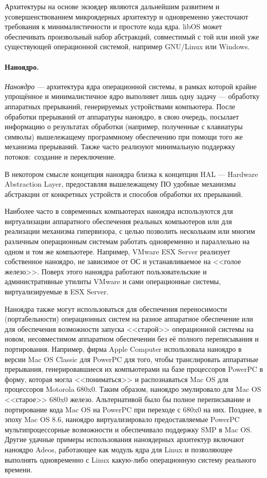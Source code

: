Архитектуры на основе экзоядер являются дальнейшим развитием и усовершенствованием микроядерных архитектур и одновременно ужесточают требования к минималистичности и простоте кода ядра. libOS может обеспечивать произвольный набор абстракций, совместимый с той или иной уже существующей операционной системой, например GNU/Linux или Windows.

\paragraph{Наноядро.}\label{base:os:structure:kernel:types:nanokernel} \emph{Наноядро} --- архитектура ядра операционной системы, в рамках которой крайне упрощённое и минималистичное ядро выполняет лишь одну задачу --- обработку аппаратных прерываний, генерируемых устройствами компьютера.
После обработки прерываний от аппаратуры наноядро, в свою очередь, посылает информацию о результатах обработки (например, полученные с клавиатуры символы) вышележащему программному обеспечению при помощи того же механизма прерываний. Также часто реализуют минимальную поддержку потоков:~создание и переключение.

В некотором смысле концепция наноядра близка к концепции HAL --- Hardware Abstraction Layer, предоставляя вышележащему ПО удобные механизмы абстракции от конкретных устройств и способов обработки их прерываний.

Наиболее часто в современных компьютерах наноядра используются для виртуализации аппаратного обеспечения реальных компьютеров или для реализации механизма гипервизора, с целью позволить нескольким или многим различным операционным системам работать одновременно и параллельно на одном и том же компьютере.
Например, VMware ESX Server реализует собственное наноядро, не зависимое от ОС и устанавливаемое на <<голое железо>>. Поверх этого наноядра работают пользовательские и административные утилиты VMware и сами операционные системы, виртуализируемые в ESX Server.

Наноядра также могут использоваться для обеспечения переносимости (портабельности) операционных систем на разное аппаратное обеспечение или для обеспечения возможности запуска <<старой>> операционной системы на новом, несовместимом аппаратном обеспечении без её полного переписывания и портирования.
Например, фирма Apple Computer использовала наноядро в версии Mac OS Classic для PowerPC для того, чтобы транслировать аппаратные прерывания, генерировавшиеся их компьютерами на базе процессоров PowerPC в форму, которая могла <<пониматься>> и распознаваться Mac OS для процессоров Motorola 680x0. Таким образом, наноядро эмулировало для Mac OS <<старое>> 680x0 железо.
Альтернативой было бы полное переписывание и портирование кода Mac OS на PowerPC при переходе с 680x0 на них. Позднее, в эпоху Mac OS 8.6, наноядро виртуализировало предоставляемые PowerPC мультипроцессорные возможности и обеспечивало поддержку SMP в Mac OS.
Другие удачные примеры использования наноядерных архитектур включают наноядро Adeos, работающее как модуль ядра для Linux и позволяющее выполнять одновременно с Linux какую-либо операционную систему реального времени.

